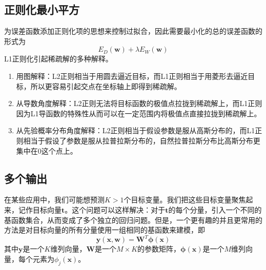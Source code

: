 \subsection*{正则化最小平方}
为误差函数添加正则化项的思想来控制过拟合，因此需要最小化的总的误差函数的形式为
\begin{equation}
	E_D(\boldsymbol{w})+\lambda E_W(\boldsymbol{w})
\end{equation}
L1正则化引起稀疏解的多种解释。
\begin{enumerate}
	\item 用图解释：L2正则相当于用圆去逼近目标，而L1正则相当于用菱形去逼近目标，所以更容易引起交点在坐标轴上即得到稀疏解。
	
	\item 从导数角度解释：L2正则无法将目标函数的极值点拉拢到稀疏解上，而L1正则因为L1导函数的特殊性从而可以在一定范围内将极值点直接拉拢到稀疏解上。
	
	\item 从先验概率分布角度解释：L2正则相当于假设参数是服从高斯分布的，而L1正则相当于假设了参数是服从拉普拉斯分布的，自然拉普拉斯分布比高斯分布更集中在0这个点上。
\end{enumerate}

\subsection*{多个输出}
在某些应用中，我们可能想预测$K>1$个目标变量。我们把这些目标变量聚焦起来，记作目标向量$\boldsymbol{t}$。这个问题可以这样解决：对于$\boldsymbol{t}$的每个分量，引入一个不同的基函数集合，从而变成了多个独立的回归问题。但是，一个更有趣的并且更常用的方法是对目标向量的所有分量使用一组相同的基函数来建模，即
\begin{equation}
	\boldsymbol{y}(\boldsymbol{x},\boldsymbol{w})=\boldsymbol{W}^T\boldsymbol{\phi}(\boldsymbol{x})
\end{equation}
其中$\boldsymbol{y}$是一个$K$维列向量，$\boldsymbol{W}$是一个$M\times K$的参数矩阵，$\boldsymbol{\phi}(\boldsymbol{x})$是一个$M$维列向量，每个元素为$\phi_j(\boldsymbol{x})$。